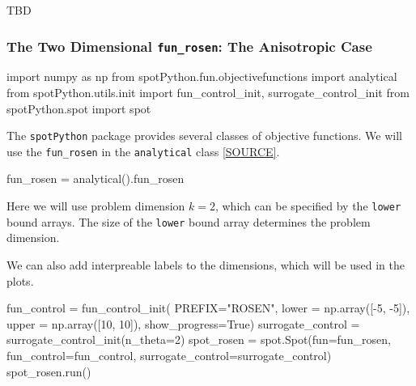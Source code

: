 \documentclass[
  letterpaper,
  DIV=11,
  numbers=noendperiod]{scrreprt}
\newenvironment{Shaded}{\begin{snugshade}}{\end{snugshade}}
\newcommand{\DecValTok}[1]{\textcolor[rgb]{0.68,0.00,0.00}{#1}}
\newcommand{\ImportTok}[1]{\textcolor[rgb]{0.00,0.46,0.62}{#1}}
\newcommand{\NormalTok}[1]{\textcolor[rgb]{0.00,0.23,0.31}{#1}}
\newcommand{\OperatorTok}[1]{\textcolor[rgb]{0.37,0.37,0.37}{#1}}
\newcommand{\StringTok}[1]{\textcolor[rgb]{0.13,0.47,0.30}{#1}}
\newcommand{\VariableTok}[1]{\textcolor[rgb]{0.07,0.07,0.07}{#1}}
\begin{document}
TBD

\subsubsection{\texorpdfstring{The Two Dimensional \texttt{fun\_rosen}:
The Anisotropic
Case}{The Two Dimensional fun\_rosen: The Anisotropic Case}}\label{the-two-dimensional-fun_rosen-the-anisotropic-case}

\begin{Shaded}
\begin{Highlighting}[]
\ImportTok{import}\NormalTok{ numpy }\ImportTok{as}\NormalTok{ np}
\ImportTok{from}\NormalTok{ spotPython.fun.objectivefunctions }\ImportTok{import}\NormalTok{ analytical}
\ImportTok{from}\NormalTok{ spotPython.utils.init }\ImportTok{import}\NormalTok{ fun\_control\_init, surrogate\_control\_init}
\ImportTok{from}\NormalTok{ spotPython.spot }\ImportTok{import}\NormalTok{ spot}
\end{Highlighting}
\end{Shaded}

The \texttt{spotPython} package provides several classes of objective
functions. We will use the \texttt{fun\_rosen} in the
\texttt{analytical} class
\href{https://github.com/sequential-parameter-optimization/spotPython/blob/main/src/spotPython/fun/objectivefunctions.py}{{[}SOURCE{]}}.

\begin{Shaded}
\begin{Highlighting}[]
\NormalTok{fun\_rosen }\OperatorTok{=}\NormalTok{ analytical().fun\_rosen}
\end{Highlighting}
\end{Shaded}

Here we will use problem dimension \(k=2\), which can be specified by
the \texttt{lower} bound arrays. The size of the \texttt{lower} bound
array determines the problem dimension.

We can also add interpreable labels to the dimensions, which will be
used in the plots.

\begin{Shaded}
\begin{Highlighting}[]
\NormalTok{fun\_control }\OperatorTok{=}\NormalTok{ fun\_control\_init(}
\NormalTok{              PREFIX}\OperatorTok{=}\StringTok{"ROSEN"}\NormalTok{,}
\NormalTok{              lower }\OperatorTok{=}\NormalTok{ np.array([}\OperatorTok{{-}}\DecValTok{5}\NormalTok{, }\OperatorTok{{-}}\DecValTok{5}\NormalTok{]),}
\NormalTok{              upper }\OperatorTok{=}\NormalTok{ np.array([}\DecValTok{10}\NormalTok{, }\DecValTok{10}\NormalTok{]),}
\NormalTok{              show\_progress}\OperatorTok{=}\VariableTok{True}\NormalTok{)}
\NormalTok{surrogate\_control }\OperatorTok{=}\NormalTok{ surrogate\_control\_init(n\_theta}\OperatorTok{=}\DecValTok{2}\NormalTok{)}
\NormalTok{spot\_rosen }\OperatorTok{=}\NormalTok{ spot.Spot(fun}\OperatorTok{=}\NormalTok{fun\_rosen,}
\NormalTok{                  fun\_control}\OperatorTok{=}\NormalTok{fun\_control,}
\NormalTok{                  surrogate\_control}\OperatorTok{=}\NormalTok{surrogate\_control)}
\NormalTok{spot\_rosen.run()}
\end{Highlighting}
\end{Shaded}
\end{document}
